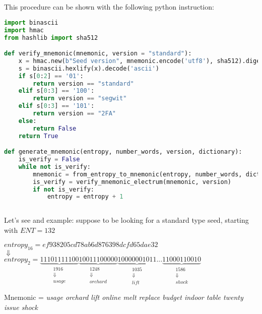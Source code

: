 \\ \\ 
This procedure can be shown with the following python instruction:
\begin{lstlisting}[language=Python]
import binascii
import hmac
from hashlib import sha512

def verify_mnemonic(mnemonic, version = "standard"):
	x = hmac.new(b"Seed version", mnemonic.encode('utf8'), sha512).digest()
	s = binascii.hexlify(x).decode('ascii')
	if s[0:2] == '01':
		return version == "standard"
	elif s[0:3] == '100':
		return version == "segwit"
	elif s[0:3] == '101':
		return version == "2FA"
	else:
		return False
	return True

def generate_mnemonic(entropy, number_words, version, dictionary):	
	is_verify = False
	while not is_verify:
		mnemonic = from_entropy_to_mnemonic(entropy, number_words, dictionary)
		is_verify = verify_mnemonic_electrum(mnemonic, version)
		if not is_verify:
			entropy = entropy + 1
		
\end{lstlisting}

\begin{flushleft}
	Let's see and example: suppose to be looking for a standard type seed, starting with $ENT=132$
\end{flushleft}

\begin{center} 
	$ entropy_{16} = ef938205cd78ab6d876398dcfd65dae32 $ 
	\\
	$\Downarrow $
	\\
	$entropy_{2}= \underbrace{11101111100}_{\substack{1916 \\ \Downarrow\\ usage} }
	\underbrace{10011100000}_{\substack{1248 \\ \Downarrow\\ orchard}}
	\underbrace{10000001011}_{\substack{1035 \\ \Downarrow\\ lift}}
	...
	\underbrace{11000110010}_{\substack{1586 \\ \Downarrow\\ shock}}  $
\end{center}
Mnemonic = \textit{usage orchard lift online melt replace budget indoor table twenty issue shock}

